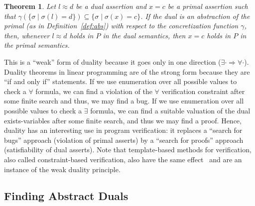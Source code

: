 \documentclass[preprint]{sig-alternate-05-2015}
\newtheorem{theorem}{Theorem}
\newcommand\ignore[1]{{}}
\def\ds{{\mathit{\theta}}}   %
\begin{document}
\begin{theorem}\label{thm:duality}
  Let $l\approx d$ be a dual assertion and $x=c$ be a primal assertion
  such that $\gamma(\{\sigma \mid \sigma(l)=d\}) \subseteq \{\sigma \mid \sigma(x)=c\}$.
  If the dual is an abstraction of the primal (as in Definition~\ref{def:abs})
  with respect to the concretization function $\gamma$,
  then, whenever
  $l \approx d$ holds in $P$ in the dual semantics, then
  $x = c$ holds in $P$ in the primal semantics.
\end{theorem}
\ignore{
\begin{proof}
  Let $\ds\in\semt(P)(U')$.
  Since $l\approx d$ holds in $P$ in the dual semantics,
  it follows that $\ds(l)=d$.
  Let $\sigma\in\sem(P)(U)$ be any reachable primal state.
  We need to show that $\sigma(x)=c$.
  Since the dual semantics is an abstraction of the primal,
  it follows from Theorem~\ref{thm:duality} that
  $\sigma\in\gamma(\ds)$.
  Since we assumed that
  $\gamma(\{\sigma \mid \sigma(l)=d\}) \subseteq \{\sigma \mid \sigma(x)=c\}$,
  and since $\ds(l)=d$,
  it follows that
  $\gamma(\ds) \subseteq \{\sigma \mid \sigma(x)=c\}$.
  Since $\sigma\in\gamma(\ds)$,
  it follows that $\sigma\in \{\sigma \mid \sigma(x)=c\}$,
  which implies $\sigma(x)=c$.
\end{proof}
\endignore}

This is a ``weak'' form of duality because it goes only in one direction
($\exists\cdot\Rightarrow\forall\cdot$).
Duality theorems in linear programming are of the strong form because
they are ``if and only if'' statements. %
If we use enumeration over all possible values to check a
$\forall$ formula, we can find a violation of the $\forall$ verification constraint
after some finite search and thus, we may find a bug.
If we use enumeration over all possible values to check a
$\exists$ formula, we can find a suitable valuation of the dual exists-variables 
after some finite search, and thus we may find a proof.
Hence, duality has an interesting use in program verification: it replaces a 
``search for bugs'' approach (violation of primal asserts)
by a ``search for proofs'' approach (satisfiability of dual asserts).
Note that template-based methods for verification, also called
constraint-based verification, also have the same effect~\cite{Gulwani08:PLDI,Gulwani13:STTT}
and are an instance of the weak duality principle.

\subsection{Finding Abstract Duals}\label{sec:findingduals}
\end{document}
